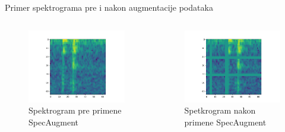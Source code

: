 \documentclass{beamer}
\begin{document}
\begin{frame}{Primer spektrograma pre i nakon augmentacije podataka}
   \begin{columns}[t]
       \begin{column}{0.5\textwidth}
            \begin{figure}
                \centering
                \includegraphics[scale=0.37]{SpectrogramBeforeAugment.png}
                \centering
                \captionsetup{justification=centering}
                \caption{Spektrogram pre primene SpecAugment}
                \label{fig:my_label}
            \end{figure}
       \end{column}
       \begin{column}{0.5\textwidth}
            \begin{figure}
                \centering
                \includegraphics[scale=0.37]{SpectrogramAfterAugment.png}
                \centering
                \captionsetup{justification=centering}
                \caption{Spetkrogram nakon primene SpecAugment}
                \label{fig:my_label}
            \end{figure}
       \end{column}
   \end{columns}
\end{frame}
\end{document}

